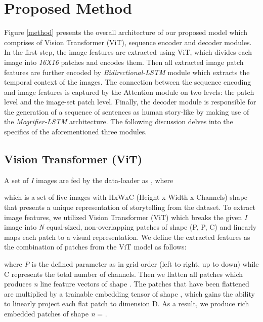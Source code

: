 \documentclass[runningheads]{llncs}
\begin{document}
\section{Proposed Method}
Figure \ref{method} presents the overall architecture of our proposed model which comprises of Vision Transformer (ViT), sequence encoder and decoder modules. In the first step, the image features are extracted using ViT, which divides each image into {\em16X16} patches and encodes them. Then all extracted image patch features are further encoded by {\em Bidirectional-LSTM} module which extracts the temporal context of the images. The connection between the sequence encoding and image features is captured by the Attention module on two levels: the patch level and the image-set patch level. Finally, the decoder module is responsible for the generation of a sequence of sentences as human story-like by making use of the {\em Mogrifier-LSTM} architecture. The following discussion delves into the specifics of the aforementioned three modules.



\subsection{Vision Transformer (ViT)}
A set of {\em I} images are fed by the data-loader as , where

 which is a set of five images with HxWxC (Height x Width x Channels) shape that presents a unique representation of storytelling from the dataset. To extract image features, we utilized Vision Transformer (ViT) \cite{dosovitskiy2020image} which breaks the given {\em I} image into {\em N} equal-sized, non-overlapping patches of shape (P, P, C) and linearly maps each patch to a visual representation. We define the extracted features as the combination of patches from the ViT model as follows:

where {\em P} is the defined parameter as in grid order (left to right, up to down) while C represents the total number of channels. Then we flatten all patches which produces {\em n} line feature vectors of shape .
The patches that have been flattened are multiplied by a trainable embedding tensor of shape , which gains the ability to linearly project each flat patch to dimension D. As a result, we produce rich embedded patches of shape {\em n} = .
\end{document}
